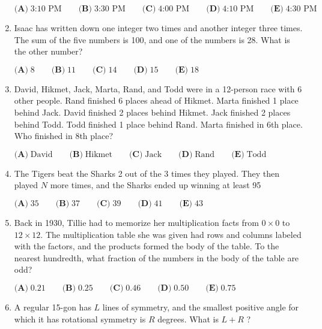 \documentclass{article}
\begin{document}
\begin{enumerate}[label=\arabic*., itemsep=0.5em]
$\textbf{(A)}\; \text{3:10 PM} \qquad\textbf{(B)}\; \text{3:30 PM} \qquad\textbf{(C)}\; \text{4:00 PM} \qquad\textbf{(D)}\; \text{4:10 PM} \qquad\textbf{(E)}\; \text{4:30 PM}$\par \vspace{0.5em}\item Isaac has written down one integer two times and another integer three times. The sum of the five numbers is 100, and one of the numbers is 28. What is the other number?

$\textbf{(A)}\; 8 \qquad\textbf{(B)}\; 11 \qquad\textbf{(C)}\; 14 \qquad\textbf{(D)}\; 15 \qquad\textbf{(E)}\; 18$\par \vspace{0.5em}\item David, Hikmet, Jack, Marta, Rand, and Todd were in a 12-person race with 6 other people. Rand finished 6 places ahead of Hikmet. Marta finished 1 place behind Jack. David finished 2 places behind Hikmet. Jack finished 2 places behind Todd. Todd finished 1 place behind Rand. Marta finished in 6th place. Who finished in 8th place?

$\textbf{(A)}\; \text{David} \qquad\textbf{(B)}\; \text{Hikmet} \qquad\textbf{(C)}\; \text{Jack} \qquad\textbf{(D)}\; \text{Rand} \qquad\textbf{(E)}\; \text{Todd}$\par \vspace{0.5em}\item The Tigers beat the Sharks 2 out of the 3 times they played. They then played $N$ more times, and the Sharks ended up winning at least 95%

$\textbf{(A)}\; 35 \qquad  \textbf{(B)}\; 37 \qquad \textbf{(C)}\; 39 \qquad \textbf{(D)}\; 41 \qquad \textbf{(E)}\; 43$\par \vspace{0.5em}\item Back in 1930, Tillie had to memorize her multiplication facts from $0 \times 0$ to $12 \times 12$. The multiplication table she was given had rows and columns labeled with the factors, and the products formed the body of the table. To the nearest hundredth, what fraction of the numbers in the body of the table are odd?

$\textbf{(A)}\; 0.21 \qquad\textbf{(B)}\; 0.25 \qquad\textbf{(C)}\; 0.46 \qquad\textbf{(D)}\; 0.50 \qquad\textbf{(E)}\; 0.75$\par \vspace{0.5em}\item A regular 15-gon has $L$ lines of symmetry, and the smallest positive angle for which it has rotational symmetry is $R$ degrees. What is $L+R$ ?


\end{enumerate}
\end{document}
